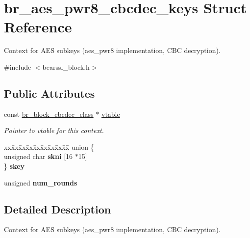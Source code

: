\hypertarget{structbr__aes__pwr8__cbcdec__keys}{}\section{br\+\_\+aes\+\_\+pwr8\+\_\+cbcdec\+\_\+keys Struct Reference}
\label{structbr__aes__pwr8__cbcdec__keys}


Context for A\+ES subkeys ({\ttfamily aes\+\_\+pwr8} implementation, C\+BC decryption).  




{\ttfamily \#include $<$bearssl\+\_\+block.\+h$>$}

\subsection*{Public Attributes}
\begin{DoxyCompactItemize}
\item 
\mbox{\label{structbr__aes__pwr8__cbcdec__keys_a4bf8db2e1e063a911bd0776aa290ee5a}} 
const \hyperlink{bearssl__block_8h_a5542970c820eeee2e62766368be8fb7f}{br\+\_\+block\+\_\+cbcdec\+\_\+class} $\ast$ \hyperlink{structbr__aes__pwr8__cbcdec__keys_a4bf8db2e1e063a911bd0776aa290ee5a}{vtable}
\begin{DoxyCompactList}\small\item\em Pointer to vtable for this context. \end{DoxyCompactList}\item 
\mbox{\label{structbr__aes__pwr8__cbcdec__keys_a6fa69ebba90f8522d7f3571800cee3c1}} 
\begin{tabbing}
xx\=xx\=xx\=xx\=xx\=xx\=xx\=xx\=xx\=\kill
union \{\\
\>unsigned char {\bfseries skni} \mbox{[}16 $\ast$15\mbox{]}\\
\} {\bfseries skey}\\

\end{tabbing}\item 
\mbox{\label{structbr__aes__pwr8__cbcdec__keys_a244af252db4819c9abb73659e5c10cf6}} 
unsigned {\bfseries num\+\_\+rounds}
\end{DoxyCompactItemize}


\subsection{Detailed Description}
Context for A\+ES subkeys ({\ttfamily aes\+\_\+pwr8} implementation, C\+BC decryption). 

